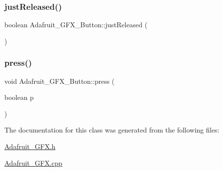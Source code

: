 \mbox{\label{class_adafruit___g_f_x___button_a8a139332b95997168ba0da37973d2887}} 
\subsubsection{\texorpdfstring{just\+Released()}{justReleased()}}
{\footnotesize\ttfamily boolean Adafruit\+\_\+\+G\+F\+X\+\_\+\+Button\+::just\+Released (\begin{DoxyParamCaption}{ }\end{DoxyParamCaption})}

\mbox{\label{class_adafruit___g_f_x___button_a221d9753f7d8e8f7f9c1ebbee69d02bd}} 
\subsubsection{\texorpdfstring{press()}{press()}}
{\footnotesize\ttfamily void Adafruit\+\_\+\+G\+F\+X\+\_\+\+Button\+::press (\begin{DoxyParamCaption}\item[{boolean}]{p }\end{DoxyParamCaption})}



The documentation for this class was generated from the following files\+:\begin{DoxyCompactItemize}
\item 
\hyperlink{_adafruit___g_f_x_8h}{Adafruit\+\_\+\+G\+F\+X.\+h}\item 
\hyperlink{_adafruit___g_f_x_8cpp}{Adafruit\+\_\+\+G\+F\+X.\+cpp}\end{DoxyCompactItemize}
